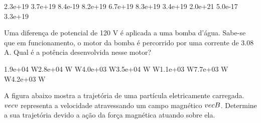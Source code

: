 \documentclass[12pt, addpoints]{exam}
\begin{document}
\begin{questions}
\begin{multicols*}{2}
\begin{oneparchoices}
\choice 2.3e+19 \choice 3.7e+19 \choice 8.4e-19 \choice 8.2e+19 \choice 6.7e+19 \choice 8.3e+19 \choice 3.4e+19 \choice 2.0e+21 \choice 5.0e-17 \choice 3.3e+19 
\end{oneparchoices}\question Uma diferença de potencial de 120 V é aplicada a uma bomba d’água. Sabe-se que em funcionamento, o motor da bomba é percorrido por uma corrente de    3.08 A. Qual é a potência desenvolvida nesse motor?

\begin{oneparchoices}
\choice 1.9e+04 W\choice 2.8e+04 W W\choice 4.0e+03 W\choice 3.5e+04 W W\choice 1.1e+03 W\choice 7.7e+03 W W\choice 4.2e+03 W
\end{oneparchoices}\question A ﬁgura abaixo mostra a trajetória de uma partícula eletricamente carregada. $\\vec{{v}}$ representa a velocidade atravessando um campo magnético $\\vec{{B}}$. Determine a sua trajetória devido a ação da força magnética atuando sobre ela.
        
        \begin{center}
            \begin{minipage}[c]{0.5\linewidth}
            \end{minipage}
        \end{center}


\end{multicols*}
\end{questions}
\end{document}
